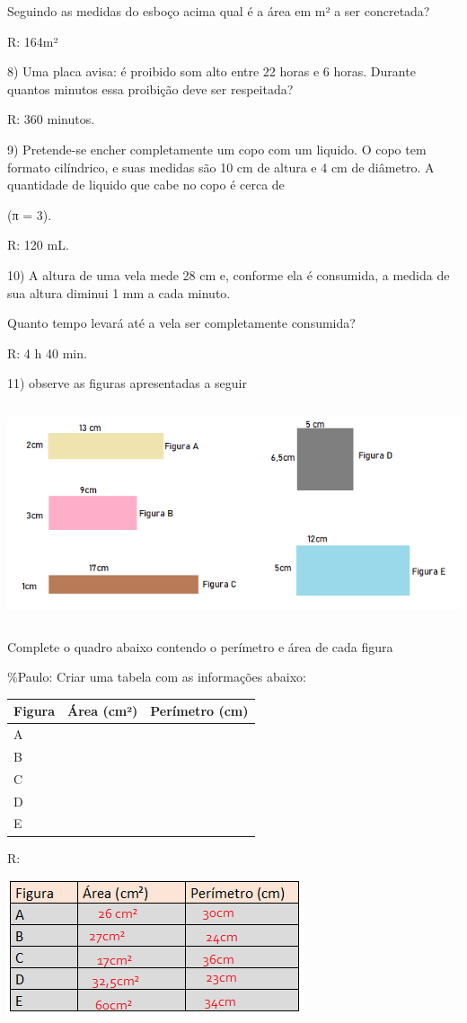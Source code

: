 Seguindo as medidas do esboço acima qual é a área em m² a ser
concretada?

R: 164m²

8) Uma placa avisa: é proibido som alto entre 22 horas e 6 horas.
Durante quantos minutos essa proibição deve ser respeitada?

R: 360 minutos.

9) Pretende-se encher completamente um copo com um liquido. O copo tem
formato cilíndrico, e suas medidas são 10 cm de altura e 4 cm de
diâmetro. A quantidade de liquido que cabe no copo é cerca de

(π = 3).

R: 120 mL.

10) A altura de uma vela mede 28 cm e, conforme ela é consumida, a
medida de sua altura diminui 1 mm a cada minuto.

Quanto tempo levará até a vela ser completamente consumida?

R: 4 h 40 min.

11) observe as figuras apresentadas a seguir

\includegraphics[width=5.90625in,height=2.51042in]{./imgSAEB_6_MAT/media/image98.png}

Complete o quadro abaixo contendo o perímetro e área de cada figura

\%Paulo: Criar uma tabela com as informações abaixo:

\begin{longtable}[]{@{}lll@{}}
\toprule
Figura & Área (cm²) & Perímetro (cm)\tabularnewline
\midrule
\endhead
A & ~ & ~\tabularnewline
B & ~ & ~\tabularnewline
C & ~ & ~\tabularnewline
D & ~ & ~\tabularnewline
E & ~ & ~\tabularnewline
\bottomrule
\end{longtable}

R:

\includegraphics[width=3.44792in,height=1.58333in]{./imgSAEB_6_MAT/media/image99.png}

